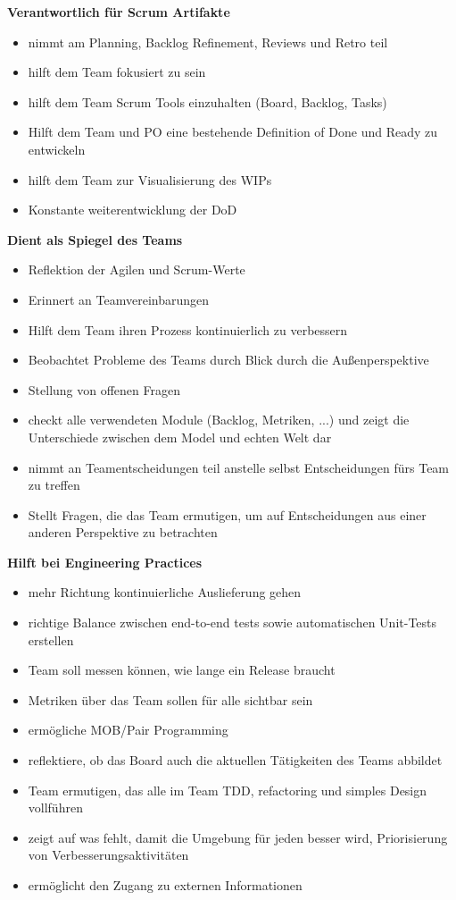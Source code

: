 \textbf{Verantwortlich für Scrum Artifakte}
\begin{itemize}
  \item nimmt am Planning, Backlog Refinement, Reviews und Retro teil
  \item hilft dem Team fokusiert zu sein
  \item hilft dem Team Scrum Tools einzuhalten (Board, Backlog, Tasks)
  \item Hilft dem Team und PO eine bestehende Definition of Done und Ready zu entwickeln
  \item hilft dem Team zur Visualisierung des WIPs
  \item Konstante weiterentwicklung der DoD
\end{itemize}


\textbf{Dient als Spiegel des Teams}


\begin{itemize}
  \item Reflektion der Agilen und Scrum-Werte
  \item Erinnert an Teamvereinbarungen
  \item Hilft dem Team ihren Prozess kontinuierlich zu verbessern
  \item Beobachtet Probleme des Teams durch Blick durch die Außenperspektive
  \item Stellung von offenen Fragen
  \item checkt alle verwendeten Module (Backlog, Metriken, ...) und zeigt die Unterschiede zwischen
    dem Model und echten Welt dar
  \item nimmt an Teamentscheidungen teil anstelle selbst Entscheidungen fürs Team zu treffen
  \item Stellt Fragen, die das Team ermutigen, um auf Entscheidungen aus einer anderen Perspektive
    zu betrachten
\end{itemize}


\textbf{Hilft bei Engineering Practices}


\begin{itemize}
  \item mehr Richtung kontinuierliche Auslieferung gehen
  \item richtige Balance zwischen end-to-end tests sowie automatischen Unit-Tests erstellen
  \item Team soll messen können, wie lange ein Release braucht
  \item Metriken über das Team sollen für alle sichtbar sein
  \item ermögliche MOB/Pair Programming
  \item reflektiere, ob das Board auch die aktuellen Tätigkeiten des Teams  abbildet
  \item Team ermutigen, das alle im Team TDD, refactoring und simples Design vollführen
  \item zeigt auf was fehlt, damit die Umgebung für jeden besser wird, Priorisierung von
    Verbesserungsaktivitäten
  \item ermöglicht den Zugang zu externen Informationen
\end{itemize}


